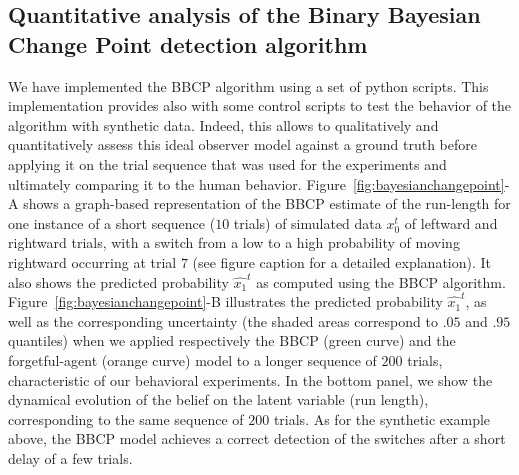 \documentclass[12pt,english]{article}%
\newcommand{\seeFig}[1]{Figure~\ref{fig:#1}}
\newcommand{\seeApp}[1]{Appendix~\ref{app:#1}}
\begin{document}
\subsection{Quantitative analysis of the Binary Bayesian Change Point detection algorithm}
We have implemented 
the BBCP algorithm %
using a set of python scripts.
This implementation provides also with some control scripts
to test the behavior of the algorithm with synthetic data.
Indeed, this allows to qualitatively and quantitatively assess
this ideal observer model against a ground truth before applying it
on the trial sequence that was used for the experiments and
ultimately comparing it to the human behavior. %
\seeFig{bayesianchangepoint}-A shows a graph-based representation of the BBCP estimate of the run-length for one instance of a short sequence ($10$ trials) of simulated data $x_0^t$
of leftward and rightward trials, with a switch from a low to a high probability
of moving rightward occurring at trial $7$ (see figure caption for a detailed explanation).
It also shows the predicted probability $\hat{x_1}^t$
as computed using the BBCP algorithm.
\seeFig{bayesianchangepoint}-B illustrates the predicted probability $\hat{x_1}^t$, as well as the corresponding uncertainty (the shaded areas correspond to $.05$ and $.95$ quantiles) when
we applied respectively the BBCP (green curve) and the forgetful-agent (orange curve) model to
a longer sequence of $200$ trials,
characteristic of our behavioral experiments.
In the bottom panel,
we show the dynamical evolution of the belief on the latent variable (run length),
corresponding to the same sequence of $200$ trials.
As for the synthetic example above,
the BBCP model achieves a correct detection of the switches after a short delay of a few trials.
\end{document}
